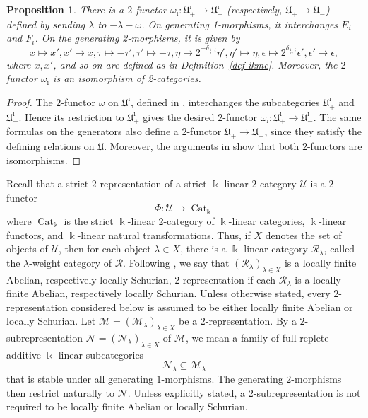 \documentclass[a4,10pt]{amsart}
\numberwithin{equation}{section}
\newtheorem{Prop}[Theorem]{Proposition}
\theoremstyle{definition}
\begin{document}
\begin{Prop}\cite[(3.19)]{BSWW-icate}\label{omegaimath}
    There is a $2$-functor $\omega_\imath: \mathfrak U^\imath_+\rightarrow \mathfrak U^\imath_-$   (respectively, $\mathfrak U_+\rightarrow \mathfrak U_-$) defined by  sending  $\lambda$ to $-\lambda-\omega$. On  generating 1-morphisms, it interchanges  $ E_i$ and $F_i$. On the  generating  2-morphisms, it is given  by 
    \[ x\mapsto x', x'\mapsto x, \tau \mapsto -\tau', \tau'\mapsto -\tau, \eta\mapsto 2^{-\delta_{\frac{1}{2},i}}\eta', \eta'\mapsto \eta, \epsilon \mapsto 2^{\delta_{\frac{1}{2},i}}\epsilon', \epsilon'\mapsto \epsilon, \]
    where $x, x'$, and so on  are defined as in Definition~\ref{def-ikmc}.
  Moreover, the $2$-functor $\omega_\imath$ is an isomorphism of 2-categories. 
\end{Prop}
\begin{proof}
The   $2$-functor $\omega$ on $\mathfrak U^\imath$,  defined in
\cite[(3.19)]{BSWW-icate}, interchanges the subcategories
$\mathfrak U^\imath_+$ and $\mathfrak U^\imath_-$. Hence its restriction to
$\mathfrak U^\imath_+$ gives the desired $2$-functor
$ \omega_\imath:\mathfrak U^\imath_+\longrightarrow \mathfrak U^\imath_-$.
The same formulas on the generators also define a $2$-functor $\mathfrak U_+\longrightarrow \mathfrak U_-$, since they satisfy the defining relations on $\mathfrak U$. Moreover, the arguments in \cite[(3.19)]{BSWW-icate} show that both $2$-functors are isomorphisms. \end{proof}



Recall that a strict $2$-representation of a strict $\Bbbk$-linear $2$-category $\mathcal U$ is  a \(2\)-functor
\[
\Phi:\mathcal U \longrightarrow \operatorname{Cat}_\Bbbk
\]
where $ \operatorname{Cat}_\Bbbk$  is the strict $\Bbbk$-linear $2$-category of $\Bbbk$-linear categories, $\Bbbk$-linear functors, and $\Bbbk$-linear natural transformations. 
Thus, if $X$ denotes the set of objects of $\mathcal U$, then for each object $\lambda\in X$,   there is a $\Bbbk$-linear category $\mathcal R_\lambda$, called the $\lambda$-weight category of $\mathcal R$.  Following \cite{BSW-heisenberg}, we say that  $(\mathcal R_\lambda)_{\lambda\in X} $ is a locally finite Abelian, respectively  locally Schurian, 
$2$-representation if each  $\mathcal R_\lambda$  is a locally finite Abelian,  respectively locally  Schurian.
Unless otherwise  stated, every $2$-representation considered below is assumed to be either locally finite Abelian or locally Schurian.
Let $\mathcal M=(\mathcal M_\lambda)_{\lambda\in X}$ be a
$2$-representation. By a $2$-subrepresentation
$\mathcal N=(\mathcal N_\lambda)_{\lambda\in X}$ of $\mathcal M$,
we mean a family of full replete additive $\Bbbk$-linear
subcategories
\[
\mathcal N_\lambda\subseteq\mathcal M_\lambda
\]
that is stable under all generating $1$-morphisms. The generating
$2$-morphisms then restrict naturally to $\mathcal N$.
Unless explicitly stated, a $2$-subrepresentation is not required
to be locally finite Abelian or locally Schurian. 
\end{document}
